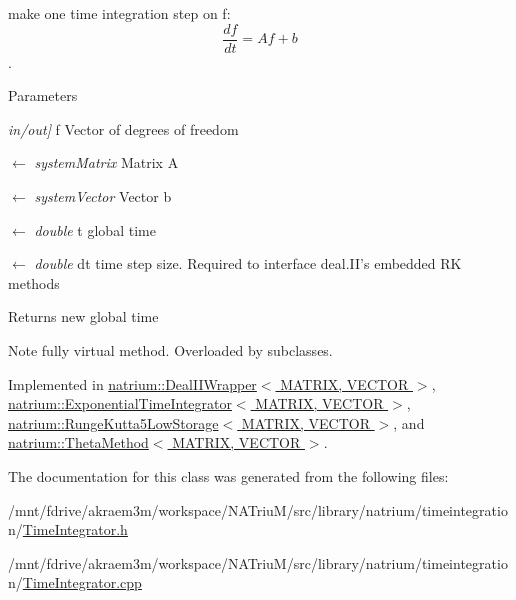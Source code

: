 make one time integration step on f: \[ \frac{df}{dt} = Af+b \]. 
\begin{DoxyParams}{Parameters}
\item[{\em in/out\mbox{]}}]f Vector of degrees of freedom \item[\mbox{$\leftarrow$} {\em systemMatrix}]Matrix A \item[\mbox{$\leftarrow$} {\em systemVector}]Vector b \item[\mbox{$\leftarrow$} {\em double}]t global time \item[\mbox{$\leftarrow$} {\em double}]dt time step size. Required to interface deal.II's embedded RK methods \end{DoxyParams}
\begin{DoxyReturn}{Returns}
new global time 
\end{DoxyReturn}
\begin{DoxyNote}{Note}
fully virtual method. Overloaded by subclasses. 
\end{DoxyNote}


Implemented in \hyperlink{classnatrium_1_1DealIIWrapper_a62621205ff77a46c4f3ef01c3aefb06d}{natrium::DealIIWrapper$<$ MATRIX, VECTOR $>$}, \hyperlink{classnatrium_1_1ExponentialTimeIntegrator_ae0a9cff9bdafab123016db72d1439ef8}{natrium::ExponentialTimeIntegrator$<$ MATRIX, VECTOR $>$}, \hyperlink{classnatrium_1_1RungeKutta5LowStorage_a11ed7e7ef3b4a5e575452261bc783a21}{natrium::RungeKutta5LowStorage$<$ MATRIX, VECTOR $>$}, and \hyperlink{classnatrium_1_1ThetaMethod_a247c639f49a05904dae01b05115bc7e4}{natrium::ThetaMethod$<$ MATRIX, VECTOR $>$}.

The documentation for this class was generated from the following files:\begin{DoxyCompactItemize}
\item 
/mnt/fdrive/akraem3m/workspace/NATriuM/src/library/natrium/timeintegration/\hyperlink{TimeIntegrator_8h}{TimeIntegrator.h}\item 
/mnt/fdrive/akraem3m/workspace/NATriuM/src/library/natrium/timeintegration/\hyperlink{TimeIntegrator_8cpp}{TimeIntegrator.cpp}\end{DoxyCompactItemize}
